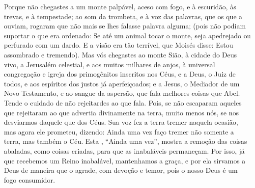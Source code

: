 {  Porque não chegastes a um monte palpável, aceso com fogo, e à escuridão, às trevas, e à tempestade;
  ao som da trombeta, e à voz das palavras, que os que a ouviam, rogaram que não mais se lhes falasse palavra alguma;
  (pois não podiam suportar o que
{} era ordenado: Se até um animal tocar o monte, seja apedrejado ou perfurado com um dardo.
{}
  E a visão era tão terrível, que Moisés disse: Estou assombrado e tremendo).
{}
  Mas vós chegastes ao monte Sião, à cidade do Deus vivo, a Jerusalém celestial, e aos muitos milhares de anjos,
  à universal congregação e igreja dos primogênitos inscritos nos Céus, e a Deus, o Juiz de todos, e aos espíritos dos justos já aperfeiçoados;
  e a Jesus, o Mediador de um Novo Testamento, e ao sangue da aspersão, que fala melhores coisas que
{} Abel.
  Tende o cuidado de não rejeitardes ao que fala. Pois, se não escaparam aqueles que rejeitaram ao que
{} advertia divinamente na terra, muito menos nós, se nos desviarmos daquele que
{} dos Céus.
  Sua voz fez a terra tremer naquela ocasião, mas agora ele prometeu, dizendo: Ainda uma vez faço tremer não somente a terra, mas também o Céu.
{}
  Esta
{},  “Ainda uma vez”, mostra a remoção das coisas abaladas, como coisas criadas, para que as inabaláveis permaneçam.
  Por isso, já que recebemos um Reino inabalável, mantenhamos a graça,
 e por ela sirvamos a Deus de maneira que o agrade, com devoção e temor,
  pois o nosso Deus é um fogo consumidor.
{}
\par }


